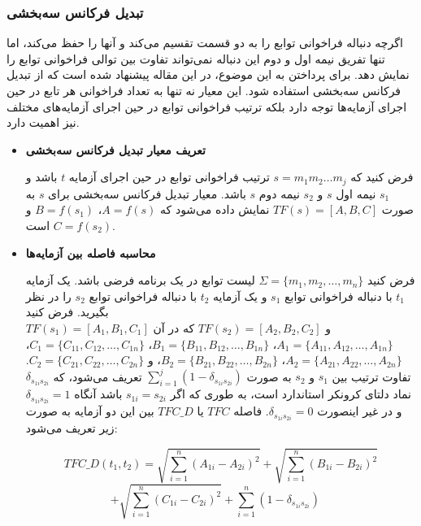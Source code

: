 \subsubsection{تبدیل فرکانس سه‌بخشی}
اگرچه دنباله فراخوانی توابع را به دو قسمت تقسیم می‌کند و آنها را حفظ می‌کند، اما تنها تفریق نیمه اول و دوم این دنباله نمی‌تواند تفاوت بین توالی فراخوانی توابع را نمایش دهد. برای پرداختن به این موضوع، در این مقاله پیشنهاد شده است که از تبدیل فرکانس سه‌بخشی  استفاده شود. این معیار نه تنها به تعداد فراخوانی هر تابع در حین اجرای آزمایه‌ها توجه دارد بلکه ترتیب فراخوانی توابع در حین اجرای آزمایه‌های مختلف نیز اهمیت دارد.

\begin{itemize}

\item \textbf{تعریف معیار تبدیل فرکانس سه‌بخشی}

فرض کنید که \(s = m_1 m_2 \dots m_j\) ترتیب فراخوانی توابع در حین اجرای آزمایه \(t\) باشد و \(s_1\) نیمه اول \(s\) و \(s_2\) نیمه دوم \(s\) باشد. معیار تبدیل فرکانس سه‌بخشی برای \(s\) به صورت \(TF(s) = [A, B, C]\) نمایش داده می‌شود که \(A = f(s)\)، \(B = f(s_1)\) و \(C = f(s_2)\) است.

\item \textbf{محاسبه فاصله بین آزمایه‌‌ها}

فرض کنید \(\Sigma = \{m_1, m_2, \dots, m_n\}\) لیست توابع در یک برنامه فرضی باشد. یک آزمایه \(t_1\) با دنباله فراخوانی توابع \(s_1\) و یک آزمایه \(t_2\) با دنباله فراخوانی توابع \(s_2\) را در نظر بگیرید. فرض کنید\\ \(TF(s_1) = [A_1, B_1, C_1]\) و \(TF(s_2) = [A_2, B_2, C_2]\) که در آن \(A_1 = \{A_{11}, A_{12}, \dots, A_{1n}\}\)، \(B_1 = \{B_{11}, B_{12}, \dots, B_{1n}\}\)، \(C_1 = \{C_{11}, C_{12}, \dots, C_{1n}\}\)، \(A_2 = \{A_{21}, A_{22}, \dots, A_{2n}\}\)، \(B_2 = \{B_{21}, B_{22}, \dots, B_{2n}\}\)، و \(C_2 = \{C_{21}, C_{22}, \dots, C_{2n}\}\). تفاوت ترتیب بین \(s_1\) و \(s_2\) به صورت \(\sum_{i=1}^{j} \left(1 - \delta_{s_{1i} s_{2i}}\right)\) تعریف می‌شود، که \(\delta_{s_{1i} s_{2i}}\) نماد دلتای کرونکر استاندارد است، به طوری که اگر \(s_{1i} = s_{2i}\) باشد آنگاه \(\delta_{s_{1i} s_{2i}} = 1\) و در غیر اینصورت \(\delta_{s_{1i} s_{2i}} = 0\). فاصله \(TFC\)  یا \(TFC\_D\) بین این دو آزمایه به صورت زیر تعریف می‌شود:

\[
TFC\_D(t_1, t_2) = \sqrt{\sum_{i=1}^{n} (A_{1i} - A_{2i})^2} + \sqrt{\sum_{i=1}^{n} (B_{1i} - B_{2i})^2}
\]
\[
+ \sqrt{\sum_{i=1}^{n} (C_{1i} - C_{2i})^2} + \sum_{i=1}^{n} \left(1 - \delta_{s_{1i} s_{2i}}\right)
\quad
\]

\end{itemize}

